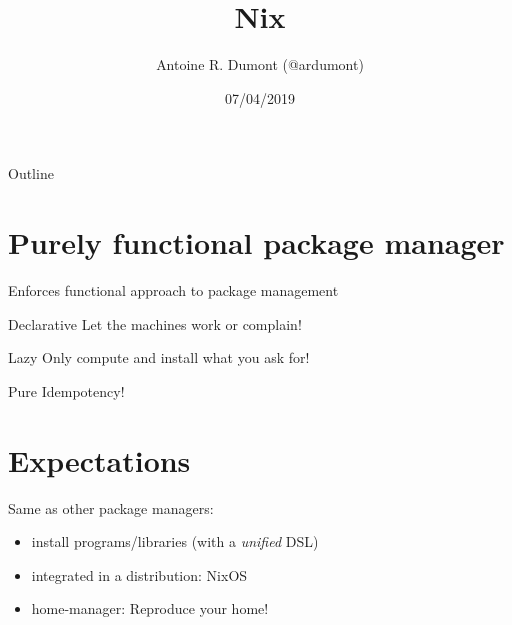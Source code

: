 \documentclass[smaller]{beamer}
\author{Antoine R. Dumont (@ardumont)}
\date{07/04/2019}
\title{Nix}
\begin{document}
\maketitle
\begin{frame}{Outline}
\tableofcontents
\end{frame}


\section{Purely functional package manager}
\label{sec:org97beb8d}

Enforces functional approach to package management\\

\begin{block}{Declarative}
Let the machines work or complain!\\
\end{block}

\begin{block}{Lazy}
Only compute and install what you ask for!\\
\end{block}

\begin{block}{Pure}
Idempotency!\\
\end{block}

\section{Expectations}
\label{sec:org4e76bb1}

Same as other package managers:\\

\begin{itemize}
\item install programs/libraries (with a \emph{unified} DSL)\\

\item integrated in a distribution: NixOS\\

\item home-manager: Reproduce your home!\\
\end{itemize}
\end{document}

